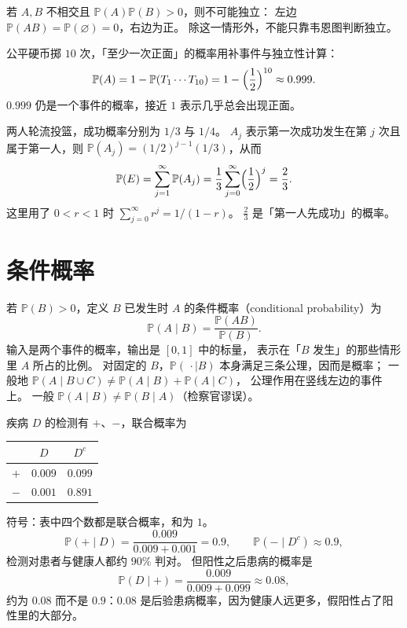 若 $A,B$ 不相交且 $\mathbb{P}(A)\mathbb{P}(B)>0$，则不可能独立：
左边 $\mathbb{P}(AB)=\mathbb{P}(\varnothing)=0$，右边为正。
除这一情形外，不能只靠韦恩图判断独立。

公平硬币掷 $10$ 次，「至少一次正面」的概率用补事件与独立性计算：
\[
\mathbb{P}(A)=1-\mathbb{P}(T_1\cdots T_{10})
=1-\Bigl(\frac12\Bigr)^{10}\approx 0.999.
\]
$0.999$ 仍是一个事件的概率，接近 $1$ 表示几乎总会出现正面。

两人轮流投篮，成功概率分别为 $1/3$ 与 $1/4$。
$A_j$ 表示第一次成功发生在第 $j$ 次且属于第一人，则
$\mathbb{P}(A_j)=(1/2)^{j-1}(1/3)$，从而
\[
\mathbb{P}(E)=\sum_{j=1}^{\infty}\mathbb{P}(A_j)=\frac13\sum_{j=0}^{\infty}\Bigl(\frac12\Bigr)^{j}=\frac23.
\]
这里用了 $0<r<1$ 时 $\sum_{j=0}^{\infty}r^{j}=1/(1-r)$。
$\tfrac23$ 是「第一人先成功」的概率。

\section{条件概率}

若 $\mathbb{P}(B)>0$，定义 $B$ 已发生时 $A$ 的条件概率（conditional probability）为
\begin{equation}
\mathbb{P}(A\mid B)=\frac{\mathbb{P}(AB)}{\mathbb{P}(B)}.
\end{equation}
输入是两个事件的概率，输出是 $[0,1]$ 中的标量，
表示在「$B$ 发生」的那些情形里 $A$ 所占的比例。
对固定的 $B$，$\mathbb{P}(\,\cdot\mid B)$ 本身满足三条公理，因而是概率；
一般地 $\mathbb{P}(A\mid B\cup C)\neq\mathbb{P}(A\mid B)+\mathbb{P}(A\mid C)$，
公理作用在竖线左边的事件上。
一般 $\mathbb{P}(A\mid B)\neq\mathbb{P}(B\mid A)$（检察官谬误）。

疾病 $D$ 的检测有 $+$、$-$，联合概率为
\begin{center}
\begin{tabular}{ccc}
\toprule
 & $D$ & $D^{c}$\\
\midrule
$+$ & $0.009$ & $0.099$\\
$-$ & $0.001$ & $0.891$\\
\bottomrule
\end{tabular}
\end{center}
\noindent 符号：表中四个数都是联合概率，和为 $1$。
\[
\mathbb{P}(+\mid D)=\frac{0.009}{0.009+0.001}=0.9,\qquad
\mathbb{P}(-\mid D^{c})\approx 0.9,
\]
检测对患者与健康人都约 $90\%$ 判对。
但阳性之后患病的概率是
\[
\mathbb{P}(D\mid +)=\frac{0.009}{0.009+0.099}\approx 0.08,
\]
约为 $0.08$ 而不是 $0.9$：$0.08$ 是后验患病概率，因为健康人远更多，假阳性占了阳性里的大部分。

